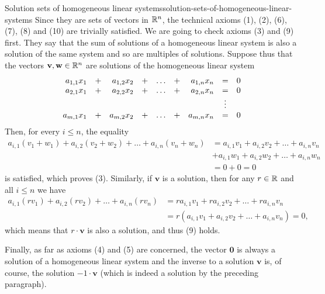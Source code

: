 \begin{example}{Solution sets of homogeneous linear systems}{solution-sets-of-homogeneous-linear-systems}
 Since they are sets of vectors in $\mathbb{R}^{n}$, the technical axioms (1), (2), (6),
 (7), (8) and (10) are trivially satisfied. We are going to check axioms (3) and
 (9) first. They say that the sum of solutions of a homogeneous linear system is
 also a solution of the same system and so are multiples of solutions. Suppose
 thus that the vectors $\mathbf{v}, \mathbf{w} \in \mathbb{R}^{n}$ are solutions of the
 homogeneous linear system
 \[
  \begin{array}{r c r c c c r c r}
   a_{1,1}x_1 & + & a_{1,2} x_2 & + & \ldots & + & a_{1,n}x_n &= & 0\\
   a_{2,1}x_1 & + & a_{2,2} x_2 & + & \ldots & + & a_{2,n}x_n &= & 0\\
              & & & & & & & \vdots &\\
   a_{m,1}x_1 & + & a_{m,2} x_2 & + & \ldots & + & a_{m,n}x_n &= & 0
  \end{array}
 \]
 Then, for every $i \leq n$, the equality
 \begin{align*}
  a_{i,1}(v_1 + w_1) + a_{i,2}(v_2 + w_2) + \ldots + a_{i,n}(v_n + w_n) &=
  a_{i,1}v_1 + a_{i,2}v_2 + \ldots + a_{i,n}v_n \\
                                                                        &+
  a_{i,1}w_1 + a_{i,2}w_2 + \ldots + a_{i,n}w_n\\
                                                                        &=
  0 + 0 = 0
 \end{align*}
 is satisfied, which proves (3). Similarly, if $\mathbf{v}$ is a solution, then
 for any $r \in \mathbb{R}$ and all $i \leq n$ we have
 \begin{align*}
  a_{i,1}(rv_1) + a_{i,2}(rv_2) + \ldots + a_{i,n}(rv_n) &= ra_{i,1}v_1 +
  ra_{i,2}v_2 + \ldots + ra_{i,n}v_n\\
                                                         &= r(a_{i,1}v_1 +
                                                         a_{i,2}v_2 + \ldots +
                                                         a_{i,n}v_n) = 0,
 \end{align*}
 which means that $r \cdot \mathbf{v}$ is also a solution, and thus (9) holds.

 Finally, as far as axioms (4) and (5) are concerned, the vector $\mathbf{0}$ is
 always a solution of a homogeneous linear system and the inverse to a solution
 $\mathbf{v}$ is, of course, the solution $-1 \cdot \mathbf{v}$ (which is indeed
 a solution by the preceding paragraph).
\end{example}

